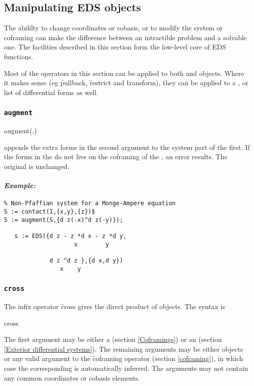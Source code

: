
\subsection{Manipulating EDS objects}
\label{Manipulating EDS objects}

The abililty to change coordinates or cobasis, or to modify the system or
coframing can make the difference between an intractible problem and a
solvable one. The facilities described in this section form the low-level
core of EDS functions.

Most of the operators in this section can be applied to both  and
 objects. Where it makes sense (eg \f{pullback},
\f{restrict} and \f{transform}), they can be applied to a , or
list of differential forms as well.

\subsubsection{\tt augment}
\label{augment}

\begin{edssyntax}
	augment(,)
\end{edssyntax}
appends the extra forms in the second argument to the system part of the
first. If the forms in the  do not live on the coframing of the
, an error results. The original  is unchanged.

\paragraph{\it Example:}
\begin{verbatim}
% Non-Pfaffian system for a Monge-Ampere equation
S := contact(1,{x,y},{z})$
S := augment(S,{d z(-x)^d z(-y)});

   s := EDS({d z - z *d x - z *d y,
                    x        y 

             d z ^d z },{d x,d y})
                x    y 
\end{verbatim}

\subsubsection{\tt cross}
\label{cross}

The infix operator \f{cross} gives the direct product of
 objects. The syntax is
\begin{edssyntax}
	 cross  
\end{edssyntax}
The first argument may be either a  (section
\ref{Coframings}) or an  (section \ref{Exterior differential
systems}). The remaining arguments may be either 
objects or any valid argument to the \f{coframing} operator (section
\ref{coframing}), in which case the corresponding  is
automatically inferred. The arguments may not contain any common
coordinates or cobasis elements.

